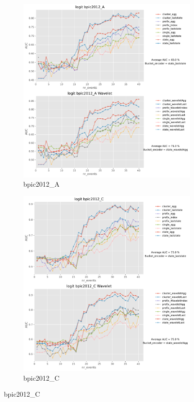 \documentclass[twoside,11pt]{Latex/Classes/PhDthesisPSnPDF}
\begin{document}
\begin{figure}[!htbp] %
	
	\begin{subfigure}{0.48\textwidth}
		\includegraphics[width=\linewidth]{images/wavelet/graphs2logit/bpic2012_A.pdf}
		\caption{bpic2012\_A} 
	\end{subfigure}\hspace*{\fill}
	\begin{subfigure}{0.48\textwidth}
		\includegraphics[width=\linewidth]{images/wavelet/graphs2logit/bpic2012_C.pdf}
		\caption{bpic2012\_C}
	\end{subfigure}
	

\end{figure}
\end{document}

